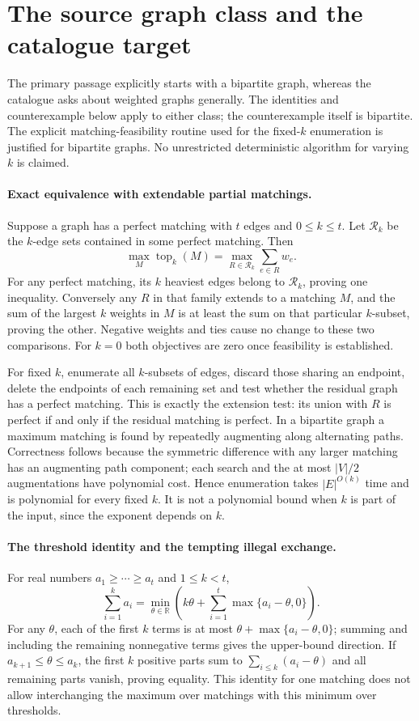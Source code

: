 \documentclass[11pt]{article}
\begin{document}
\section{The source graph class and the catalogue target}
The primary passage explicitly starts with a bipartite graph, whereas
the catalogue asks about weighted graphs generally. The identities
and counterexample below apply to either class; the counterexample
itself is bipartite. The explicit matching-feasibility routine used
for the fixed-$k$ enumeration is justified for bipartite graphs.
No unrestricted deterministic algorithm for varying $k$ is claimed.

\paragraph{Exact equivalence with extendable partial matchings.}
Suppose a graph has a perfect matching with $t$ edges and
$0\le k\le t$. Let $\mathcal R_k$ be the $k$-edge
sets contained in some perfect matching. Then
\[
\max_M\operatorname{top}_k(M)=
\max_{R\in\mathcal R_k}\sum_{e\in R}w_e.
\]
For any perfect matching, its $k$ heaviest edges belong to
$\mathcal R_k$, proving one inequality. Conversely any $R$
in that family extends to a matching $M$, and the sum of
the largest $k$ weights in $M$ is at least the sum on
that particular $k$-subset, proving the other. Negative weights
and ties cause no change to these two comparisons. For $k=0$
both objectives are zero once feasibility is established.

For fixed $k$, enumerate all $k$-subsets of edges, discard
those sharing an endpoint, delete the endpoints of each remaining
set and test whether the residual graph has a perfect matching.
This is exactly the extension test: its union with $R$ is
perfect if and only if the residual matching is perfect. In a
bipartite graph a maximum matching is found by repeatedly augmenting
along alternating paths. Correctness follows because the symmetric
difference with any larger matching has an augmenting path component;
each search and the at most $|V|/2$ augmentations have polynomial
cost. Hence enumeration takes $|E|^{O(k)}$ time and is
polynomial for every fixed $k$. It is not a polynomial bound
when $k$ is part of the input, since the exponent depends on $k$.

\paragraph{The threshold identity and the tempting illegal exchange.}
For real numbers $a_1\ge\cdots\ge a_t$ and $1\le k<t$,
\[
\sum_{i=1}^k a_i
=\min_{\theta\in\mathbb R}
\left(k\theta+\sum_{i=1}^t\max\{a_i-\theta,0\}\right).
\]
For any $\theta$, each of the first $k$ terms is at most
$\theta+\max\{a_i-\theta,0\}$; summing and including
the remaining nonnegative terms gives the upper-bound direction.
If $a_{k+1}\le\theta\le a_k$, the first $k$ positive
parts sum to $\sum_{i\le k}(a_i-\theta)$ and all remaining
parts vanish, proving equality. This identity for one matching
does not allow interchanging the maximum over matchings with this
minimum over thresholds.
\end{document}
